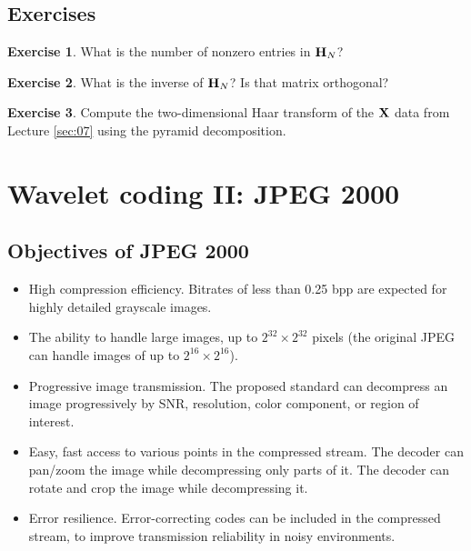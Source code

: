 \documentclass[a4paper, 11pt, openany]{book}
\numberwithin{equation}{section}
\theoremstyle{plain}
\theoremstyle{definition}
\newtheorem{exercise}   {Exercise}  [section]
\begin{document}
\subsection{Exercises}

\begin{exercise}
What is the number of nonzero entries in ${\bf H}_N$?
\end{exercise}

\begin{exercise}
What is the inverse of ${\bf H}_N$? Is that matrix orthogonal?
\end{exercise}

\begin{exercise}
Compute the two-dimensional Haar transform of the ${\bf X}$ data from Lecture \ref{sec:07} using the pyramid decomposition.
\end{exercise}
















\section{Wavelet coding II: JPEG 2000}
\label{sec:09}


\subsection{Objectives of JPEG 2000}

\begin{itemize}
    \item High compression efficiency. Bitrates of less than 0.25 bpp are expected for highly detailed grayscale images.

\item The ability to handle large images, up to $2^{32} \times 2^{32}$ pixels (the original JPEG can handle images of up to $2^{16} \times 2^{16}$).

\item Progressive image transmission. The proposed standard can decompress an image progressively by SNR, resolution, color component, or region of interest.

\item Easy, fast access to various points in the compressed stream.
The decoder can pan/zoom the image while decompressing only parts of it. The decoder can rotate and crop the image while decompressing it.

\item Error resilience. Error-correcting codes can be included in the compressed stream, to improve transmission reliability in noisy environments.
\end{itemize}
\end{document}
